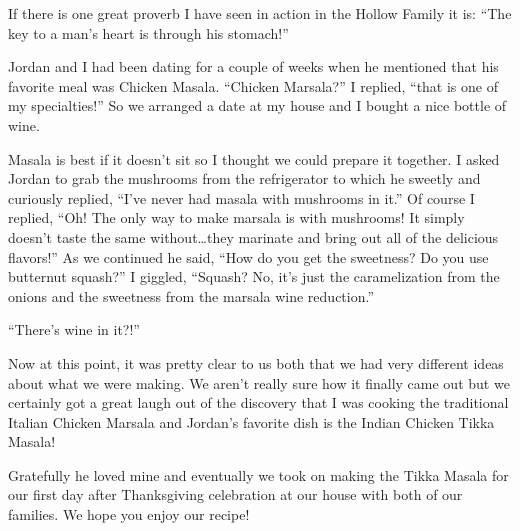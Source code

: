 If there is one great proverb I have seen in action in the Hollow Family it is:
``The key to a man's heart is through his stomach!''

Jordan and I had been dating for a couple of weeks when he mentioned that his
favorite meal was Chicken Masala. ``Chicken Marsala?'' I replied, ``that is one of
my specialties!'' So we arranged a date at my house and I bought a nice bottle of wine. 

Masala is best if it doesn't sit so I thought we could prepare it together.
I asked Jordan to grab the mushrooms from the refrigerator to which he sweetly
and curiously replied, ``I've never had masala with mushrooms in it.'' Of course
I replied, ``Oh! The only way to make marsala is with mushrooms! It simply
doesn't taste the same without{\ldots}they marinate and bring out all of the
delicious flavors!'' As we continued he said, ``How do you get the sweetness? Do
you use butternut squash?'' I giggled, ``Squash? No, it's just the caramelization
from the onions and the sweetness from the marsala wine reduction.''

``There's wine in it?!''

Now at this point, it was pretty clear to us both that we had very different
ideas about what we were making. We aren't really sure how it finally came out
but we certainly got a great laugh out of the discovery that I was cooking the
traditional Italian Chicken Marsala and Jordan's favorite dish is the Indian
Chicken Tikka Masala!

Gratefully he loved mine and eventually we took on making the Tikka Masala for
our first day after Thanksgiving celebration at our house with both of our
families. We hope you enjoy our recipe!

